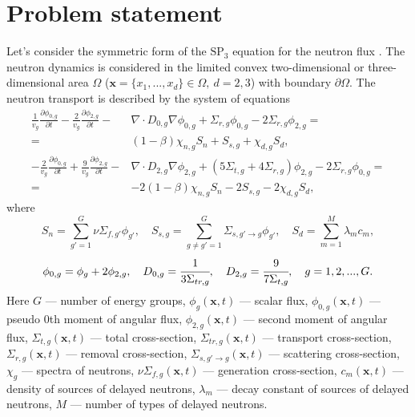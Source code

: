 \documentclass[authoryear]{elsarticle}
\begin{document}
\section{Problem statement}
Let’s consider the symmetric form of the $\mathrm{SP_3}$ equation for the neutron flux \citep{ryu2010development}.
The neutron dynamics is considered in the limited convex two-dimensional or three-dimensional area  $\Omega$ ($\bm x = \{x_1, ..., x_d\} \in \Omega, \ d = 2,3$) with boundary $\partial \Omega$. 
The neutron transport is described by the system of equations
\begin{equation}\label{1.1}
\begin{split}
 \frac{1}{v_g} \frac{\partial \phi_{0,g}}{\partial t} - \frac{2}{v_g} \frac{\partial \phi_{2,g}}{\partial t} - & \nabla \cdot D_{0,g} \nabla \phi_{0,g} + \Sigma_{r,g} \phi_{0,g} -  2\Sigma_{r,g} \phi_{2,g} = \\ 
 =  & (1-\beta)\chi_{n,g} S_{n} + S_{s,g} + \chi_{d,g} S_d, \\
 -\frac{2}{v_g} \frac{\partial \phi_{0,g}}{\partial t} + \frac{9}{v_g} \frac{\partial \phi_{2,g}}{\partial t} - & \nabla \cdot D_{2,g} \nabla \phi_{2,g} + (5\Sigma_{t,g} + 4\Sigma_{r,g}) \phi_{2,g} - 2\Sigma_{r,g} \phi_{0,g} = \\ 
 =  & -2(1-\beta)\chi_{n,g} S_{n} - 2S_{s,g} - 2\chi_{d,g} S_d,
\end{split}
\end{equation}
where
\[
S_{n} =  \sum_{g'=1}^{G} \nu \Sigma_{f,g'} \phi_{g'}, 
\quad
S_{s,g} = \sum_{g\neq g'=1}^{G} \Sigma_{s,g'\rightarrow g} \phi_{g'},
\quad
S_{d} = \sum_{m=1}^{M} \lambda_m c_m,
\]
\[
\phi_{0,g}=\phi_g + 2\phi_{2,g}, 
\quad
D_{0,g} = \cfrac{1}{3\Sigma_{tr,g}}, 
\quad
D_{2,g} = \cfrac{9}{7\Sigma_{t,g}}, 
\quad g=1,2,...,G.
\]
Here $G$ --- number of energy groups,
$\phi_g(\bm x, t)$ --- scalar flux,
$\phi_{0,g}(\bm x, t)$ --- pseudo 0th moment of angular flux,
$\phi_{2,g}(\bm x, t)$ --- second moment of angular flux,
$\Sigma_{t,g}(\bm x, t)$ --- total cross-section, 
$\Sigma_{tr,g}(\bm x, t)$ --- transport cross-section, 
$\Sigma_{r,g}(\bm x, t)$ --- removal cross-section,
$\Sigma_{s,g'\rightarrow g}(\bm x, t)$ --- scattering cross-section,
$\chi_g$  --- spectra of neutrons, 
$\nu\Sigma_{f,g}(\bm x, t)$ --- generation cross-section,
$c_m(\bm x, t)$ --- density of sources of delayed neutrons,
$\lambda_m$ --- decay constant of sources of delayed neutrons,
$M$ --- number of types of delayed neutrons.
\end{document}
